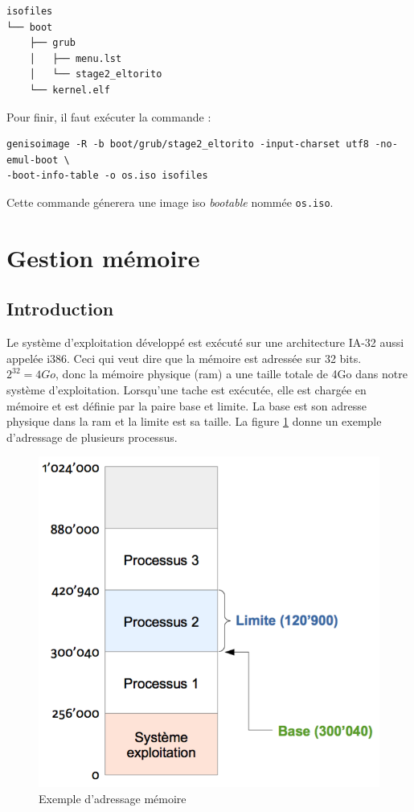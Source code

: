 \documentclass[a4paper, 12pt]{article}
\begin{document}
\begin{verbatim}
isofiles
└── boot
    ├── grub
    │   ├── menu.lst
    │   └── stage2_eltorito
    └── kernel.elf
\end{verbatim}

Pour finir, il faut exécuter la commande :
\begin{verbatim}
genisoimage -R -b boot/grub/stage2_eltorito -input-charset utf8 -no-emul-boot \
-boot-info-table -o os.iso isofiles
\end{verbatim}
Cette commande génerera une image \acrshort{iso} \textit{bootable} nommée \texttt{os.iso}\cite{ref42}.

\newpage

\section{Gestion mémoire}
\subsection{Introduction}
Le système d'exploitation développé est exécuté sur une architecture \acrshort{IA-32}
aussi appelée i386. Ceci qui veut dire que la mémoire est adressée sur 32 bits.
$2^{32}=4Go$, donc la mémoire physique (\acrshort{ram}) a une taille totale de
4Go dans notre système d'exploitation. Lorsqu'une tache est exécutée, elle est chargée
en mémoire et est définie par la paire base et limite. La base est son adresse physique
dans la \acrshort{ram} et la limite est sa taille. La figure \ref{ex_base_limit}
donne un exemple d'adressage de plusieurs processus.\cite{ref42}

\begin{figure}[!h]
  \centering
  \includegraphics[scale=0.5]{images/ex_base_limit.png}
  \caption{Exemple d'adressage mémoire}
  \label{ex_base_limit}
\end{figure}
\end{document}
